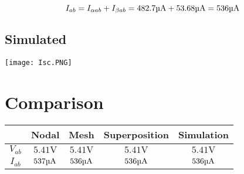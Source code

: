 \documentclass[12pt]{article}
\def\V{\mathrm{V}}
\def\A{\mathrm{A}}
\def\u{\textrm{\textmu}}
\begin{document}
$$I_{ab}=I_{\alpha ab}+I_{\beta ab}=482.7\u\A+53.68\u\A = 536\u\A$$

\clearpage

\subsection{Simulated}

\texttt{[image: Isc.PNG]}

\clearpage

\section{Comparison}

\begin{center}
	\begin{tabular}{|c|c|c|c|c|}
		\hline
		         & Nodal     & Mesh      & Superposition & Simulation \\
		\hline
		$V_{ab}$ & $5.41\V$  & $5.41\V$  & $5.41\V$      & $5.41\V$   \\
		\hline
		$I_{ab}$ & $537\u\A$ & $536\u\A$ & $536\u\A$     & $536\u\A$  \\
		\hline
	\end{tabular}
\end{center}
\end{document}

